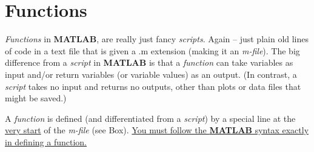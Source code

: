 \documentclass{tufte-book} %
\begin{document}

\newpage


\section{Functions}

\textit{Functions} in \textbf{MATLAB}, are really just fancy \textit{scripts}. Again -- just plain old lines of code in a text file that is given a \textsf{.m} extension (making it an \textit{m-file}). The big difference from a \textit{script} in \textbf{MATLAB} is that a \textit{function} can take variables as input and/or return variables (or variable values) as an output. (In contrast, a \textit{script} takes no input and returns no outputs, other than plots or data files that might be saved.) 

A \textit{function} is defined (and differentiated from a \textit{script}) by a special line at the \uline{very start} of the \textit{m-file} (see Box). \uline{You must follow the \textbf{MATLAB} syntax exactly in defining a function.}
\end{document}
